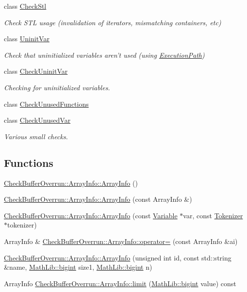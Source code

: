 \begin{DoxyCompactItemize}
class \hyperlink{class_check_stl}{Check\-Stl}
\begin{DoxyCompactList}\small\item\em Check S\-T\-L usage (invalidation of iterators, mismatching containers, etc) \end{DoxyCompactList}\item 
class \hyperlink{class_uninit_var}{Uninit\-Var}
\begin{DoxyCompactList}\small\item\em Check that uninitialized variables aren't used (using \hyperlink{class_execution_path}{Execution\-Path}) \end{DoxyCompactList}\item 
class \hyperlink{class_check_uninit_var}{Check\-Uninit\-Var}
\begin{DoxyCompactList}\small\item\em Checking for uninitialized variables. \end{DoxyCompactList}\item 
class \hyperlink{class_check_unused_functions}{Check\-Unused\-Functions}
\item 
class \hyperlink{class_check_unused_var}{Check\-Unused\-Var}
\begin{DoxyCompactList}\small\item\em Various small checks. \end{DoxyCompactList}\end{DoxyCompactItemize}
\subsection*{Functions}
\begin{DoxyCompactItemize}
\item 
\hyperlink{group___checks_gac59c163505a075d5a1b42c61663c2ced}{Check\-Buffer\-Overrun\-::\-Array\-Info\-::\-Array\-Info} ()
\item 
\hyperlink{group___checks_ga2107979c03ff20a99aafa4cdd40d52fe}{Check\-Buffer\-Overrun\-::\-Array\-Info\-::\-Array\-Info} (const Array\-Info \&)
\item 
\hyperlink{group___checks_ga0251050a5c91e1f827c3515842668164}{Check\-Buffer\-Overrun\-::\-Array\-Info\-::\-Array\-Info} (const \hyperlink{class_variable}{Variable} $\ast$var, const \hyperlink{class_tokenizer}{Tokenizer} $\ast$tokenizer)
\item 
Array\-Info \& \hyperlink{group___checks_ga28d6d4fb27e4adcc8f7f364c9073885b}{Check\-Buffer\-Overrun\-::\-Array\-Info\-::operator=} (const Array\-Info \&ai)
\item 
\hyperlink{group___checks_gadf25b1e6776f6bd756d9282e0fc00dd7}{Check\-Buffer\-Overrun\-::\-Array\-Info\-::\-Array\-Info} (unsigned int id, const std\-::string \&name, \hyperlink{class_math_lib_aea370b3be964c5704b6244d757fcac99}{Math\-Lib\-::bigint} size1, \hyperlink{class_math_lib_aea370b3be964c5704b6244d757fcac99}{Math\-Lib\-::bigint} n)
\item 
Array\-Info \hyperlink{group___checks_ga376a9d6b93c92173faeabfa906347a80}{Check\-Buffer\-Overrun\-::\-Array\-Info\-::limit} (\hyperlink{class_math_lib_aea370b3be964c5704b6244d757fcac99}{Math\-Lib\-::bigint} value) const 
\end{DoxyCompactItemize}

